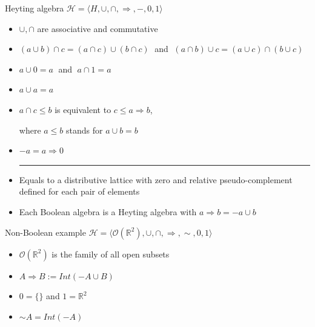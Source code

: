 \documentclass[sans]{beamer}
\begin{document}
\begin{frame}{Heyting algebra}
  $\mathcal{H} = \langle H, \cup, \cap, \Rightarrow, -, 0, 1 \rangle$
  \begin{itemize}
    \item $\cup, \cap$ are associative and commutative
    \item $(a \cup b) \cap c = (a \cap c) \cup (b \cap c) \;$ and
          $\; (a \cap b) \cup c = (a \cup c) \cap (b \cup c)$
    \item $a \cup 0 = a \;$ and $\; a \cap 1 = a$
    \item $a \cup a = a$
    \item $a \cap c \leq b$ is equivalent to $c \leq a \Rightarrow b$,
      
      where $a \leq b$ stands for $a \cup b = b$

    \item $-a = a \Rightarrow 0$

    \vfill
    \pause
    
    \hrule
    \vfill

    \item Equals to a distributive lattice with zero and relative pseudo-complement defined
          for each pair of elements
    \item Each Boolean algebra is a Heyting algebra with $a \Rightarrow b = -a \cup b$

  \end{itemize}
\end{frame}

\begin{frame}{Non-Boolean example}
  $\mathcal{H} = \langle \mathcal{O}(\mathbb{R}^2), \cup, \cap, \Rightarrow, {\sim}, 0, 1 \rangle$
  \begin{itemize}
    \item $\mathcal{O}(\mathbb{R}^2)$ is the family of all open subsets 
    \item $A \Rightarrow B := Int(-A \cup B)$
    \item $0 = \{\}$ and $1 = \mathbb{R}^2$
    \item ${\sim} A = Int(-A)$
  \end{itemize}
\end{frame}
\end{document}

